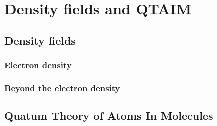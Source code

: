 
\chapter{Density fields and QTAIM}

\section{Density fields}

\subsection{Electron density}

\subsection{Beyond the electron density}

\section{Quatum Theory of Atoms In Molecules}


